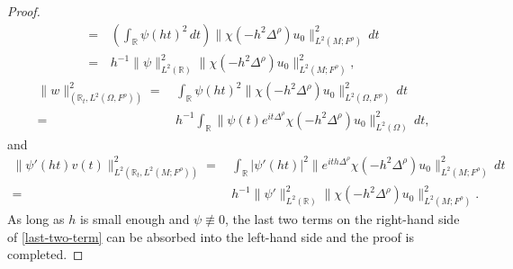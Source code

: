 \documentclass[11pt,oneside,reqno]{amsart}
\newcommand\R{\ensuremath{\mathbb{R}}}
\theoremstyle{definition}
\numberwithin{equation}{section}
\theoremstyle{plain}
\begin{document}
\begin{proof}
\begin{equation*}
\begin{aligned}
            =&\, \left(\int_\R \psi(ht)^2\,d t \right)\|\chi(-h^2\Delta^\rho)u_0\|^2_{L^2(M;F^\rho)}\,d t\\
            =&\, h^{-1}\|\psi\|^2_{L^2(\R)}\|\chi(-h^2\Delta^\rho) u_0\|^2_{L^2(M;F^\rho)},
        \end{aligned}
    \end{equation*}
    \begin{equation*}
        \begin{aligned}
            \| w\|^2_{(\R_t,L^2(\Omega,F^\rho))} = &\,\int_\R \psi(ht)^2\| \chi(-h^2\Delta^\rho) u_0 \|^2_{L^2(\Omega, F^\rho)}\,d t\\
            =&\, h^{-1}\int_\R \| \psi(t) e^{it\Delta^\rho} \chi(-h^2\Delta^\rho) u_0 \|_{L^2(\Omega)}^2\,d t,
        \end{aligned}
    \end{equation*}
    and
    \begin{equation*}
        \begin{aligned}
            \| \psi'(ht) v(t) \|^2_{L^2(\R_t,L^2(M;F^\rho))}=&\, \int_\R |\psi'(ht)|^2\| e^{ith\Delta^\rho} \chi(-h^2\Delta^\rho) u_0\|^2_{L^2(M;F^\rho)}\,d t \\
            =&\, h^{-1}\|\psi'\|^2_{L^2(\R)} \| \chi(-h^2\Delta^\rho) u_0 \|^2_{L^2(M;F^\rho)}.
        \end{aligned}
    \end{equation*}
    As long as $h$ is small enough and $\psi\not\equiv 0$, the last two terms on the right-hand side of \eqref{last-two-term} can be absorbed into the left-hand side and the proof is completed.
\end{proof}
\end{document}
